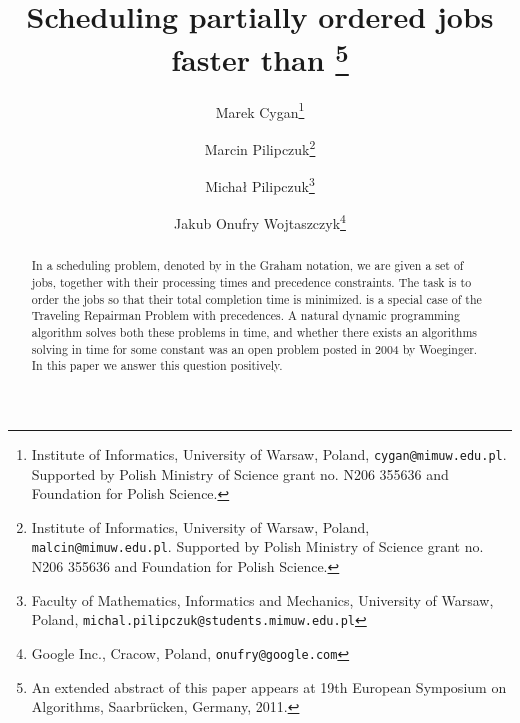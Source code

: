 \documentclass{article}
\theoremstyle{definition}
\begin{document}
\newcommand{\schedname}{{\sc{SCHED}}\xspace}
\newcommand{\schedlongname}{\xspace}
\newcommand{\czas}[1]{t(#1)}
\newcommand{\koszt}[1]{T(#1)}
\newcommand{\tudu}[1]{{\bf{TODO: #1}}}
\newcommand{\eps}{\varepsilon}
\newcommand{\pinezka}{\textrm{nil}}
\newcommand{\pred}{{\ensuremath{pred}}}
\newcommand{\succc}{{\ensuremath{succ}}}
\renewcommand{\subset}{\subseteq}
\newcommand{\Oh}{\ensuremath{O}}
\newcommand{\Ohstar}{\ensuremath{\Oh^\ast}}

\newcommand{\Wvc}{M}
\newcommand{\Whalf}{W_{\mathrm{half}}}
\newcommand{\Wquarter}{W_{\mathrm{quarter}}}
\newcommand{\matching}{\mathcal{M}}

\newcommand{\defproblemnoparam}[3]{
  \vspace{1mm}
\noindent\fbox{
  \begin{minipage}{\textwidth}  
  #1 \\ 
  {\bf{Input:}} #2  \\
  {\bf{Task:}} #3
  \end{minipage}
  }
  \vspace{1mm}
}


\title{Scheduling partially ordered jobs faster than \thanks{An extended abstract of this paper appears at 19th European Symposium on Algorithms, Saarbr\"{u}cken, Germany, 2011.}}

  \author{Marek Cygan\thanks{Institute of Informatics, University of Warsaw, Poland, \texttt{cygan@mimuw.edu.pl}. Supported by Polish Ministry of Science grant no. N206 355636 and Foundation for Polish Science.} \and
	Marcin Pilipczuk\thanks{Institute of Informatics, University of Warsaw, Poland, \texttt{malcin@mimuw.edu.pl}. Supported by Polish Ministry of Science grant no. N206 355636 and Foundation for Polish Science.} \and
	Micha\l{} Pilipczuk\thanks{Faculty of Mathematics, Informatics and Mechanics, University of Warsaw, Poland, \texttt{michal.pilipczuk@students.mimuw.edu.pl}} \and
	Jakub Onufry Wojtaszczyk\thanks{Google Inc., Cracow, Poland, \texttt{onufry@google.com}}}

\date{}

\maketitle

\begin{abstract}
In a scheduling problem, denoted by \schedlongname in the Graham notation,
we are given a set of  jobs, together with their processing
times and precedence constraints. The task is to order the jobs so that their total completion time is minimized.
\schedlongname is a special case of the Traveling Repairman Problem with precedences.
A natural dynamic programming algorithm solves both these problems in  time, and whether
there exists an algorithms solving \schedlongname{} in  time for some constant 
was an open problem posted in 2004 by Woeginger. In this paper we answer this question positively.
\end{abstract}
\end{document}
